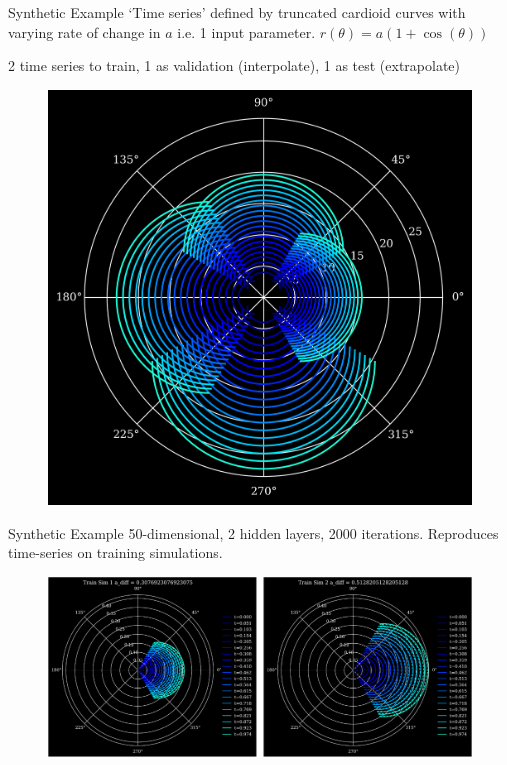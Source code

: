 \documentclass[usenames,dvipsnames]{beamer}
\theoremstyle{definition}
\begin{document}
    


\begin{frame}{Synthetic Example}
    `Time series' defined by truncated cardioid curves with varying rate of change in $a$ i.e. 1 input parameter. $r(\theta) = a(1 + \cos (\theta))$

    2 time series to train, 1 as validation (interpolate), 1 as test (extrapolate)

    \begin{figure}
        \centering
        \includegraphics[width=0.4\linewidth]{cardioid_curves.png}
        \label{fig:cc1}
    \end{figure}

\end{frame}

\begin{frame}{Synthetic Example}
50-dimensional, 2 hidden layers, 2000 iterations.
Reproduces time-series on training simulations.
\begin{figure}
    \centering
    \includegraphics[width=\linewidth]{Training_reproduction.png}
    \label{fig:cc2}
\end{figure}
\end{frame}
\end{document}
